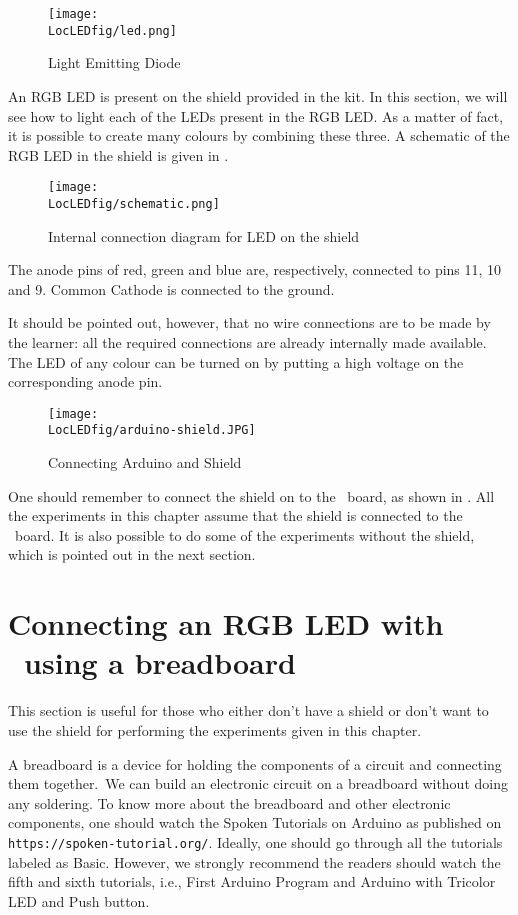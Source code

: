 \begin{figure}
  \centering
  \texttt{[image: \\LocLEDfig/led.png]}
  \caption{Light Emitting Diode}
  \label{fig:ledsym}
\end{figure}

An RGB LED is present on the shield provided in the kit.  In this
section, we will see how to light each of the LEDs present in the RGB
LED.  As a matter of fact, it is possible to create many colours by
combining these three.  A schematic of the RGB LED in the shield is
given in .
\begin{figure}
  \centering
  \texttt{[image: \\LocLEDfig/schematic.png]}
  \caption{Internal connection diagram for LED on the shield}
  \label{fig:ledblock}
\end{figure}
The anode pins of red, green and blue are, respectively, connected to
pins 11, 10 and 9.  Common Cathode is connected to the ground.

It should be pointed out, however, that no wire connections are to be
made by the learner: all the required connections are already
internally made available.  The LED of any colour can be turned on by
putting a high voltage on the corresponding anode pin.

\begin{figure}
  \centering
  \texttt{[image: \\LocLEDfig/arduino-shield.JPG]}
  \caption{Connecting Arduino and Shield}
  \label{fig:uno-shield-connect}
\end{figure}

One should remember to connect the shield on to the \arduino\ board, as
shown in . All the experiments in this
chapter assume that the shield is connected to the \arduino\ board.
It is also possible to do some of the experiments without the shield,
which is pointed out in the next section. 

\section{Connecting an RGB LED with \arduino\ using a breadboard}
This section is useful for those who either don't have a shield or don't want to use the shield
for performing the experiments given in this chapter. 

A breadboard is a device for holding the components of a circuit and connecting 
them together. We can build an electronic circuit on a breadboard without doing any 
soldering. To know more about the breadboard and other electronic components, 
one should watch the Spoken Tutorials on Arduino as published on
{\tt https://spoken-tutorial.org/}. Ideally, one should go through all the
tutorials labeled as Basic. However, we strongly recommend the readers should
watch the fifth and sixth tutorials, i.e., First Arduino Program and 
Arduino with Tricolor LED and Push button.

